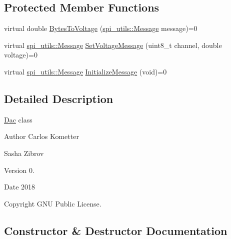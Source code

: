 \subsection*{Protected Member Functions}
\begin{DoxyCompactItemize}
\item 
virtual double \mbox{\hyperlink{classDac_a1df39dc8c6e5b50afd07b6dd8a6b9300}{Bytes\+To\+Voltage}} (\mbox{\hyperlink{structspi__utils_1_1Message}{spi\+\_\+utils\+::\+Message}} message)=0
\item 
virtual \mbox{\hyperlink{structspi__utils_1_1Message}{spi\+\_\+utils\+::\+Message}} \mbox{\hyperlink{classDac_a87132e3c19313742d92f57d9b792e0e0}{Set\+Voltage\+Message}} (uint8\+\_\+t channel, double voltage)=0
\item 
virtual \mbox{\hyperlink{structspi__utils_1_1Message}{spi\+\_\+utils\+::\+Message}} \mbox{\hyperlink{classDac_aa34ddd250cf830bba220b86d462785b5}{Initialize\+Message}} (void)=0
\end{DoxyCompactItemize}


\subsection{Detailed Description}
\mbox{\hyperlink{classDac}{Dac}} class \begin{DoxyAuthor}{Author}
Carlos Kometter 

Sasha Zibrov 
\end{DoxyAuthor}
\begin{DoxyVersion}{Version}
0. 
\end{DoxyVersion}
\begin{DoxyDate}{Date}
2018 
\end{DoxyDate}
\begin{DoxyCopyright}{Copyright}
G\+NU Public License. 
\end{DoxyCopyright}


\subsection{Constructor \& Destructor Documentation}
\mbox{\label{classDac_a43b0ea171bf0dfad95427e9751b6e191}} 
